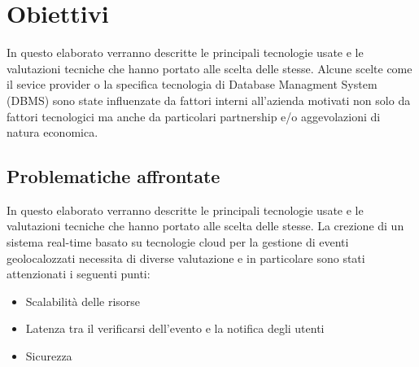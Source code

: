 \chapter{Obiettivi}
In questo elaborato verranno descritte le principali tecnologie usate e le valutazioni tecniche che hanno portato alle scelta delle stesse. Alcune scelte come il sevice provider o la specifica tecnologia di Database Managment System (DBMS) sono state influenzate da fattori interni all'azienda motivati non solo da fattori tecnologici ma anche da particolari partnership e/o aggevolazioni di natura economica.


\section{Problematiche affrontate}
In questo elaborato verranno descritte le principali tecnologie usate e le valutazioni tecniche che hanno portato alle scelta delle stesse. La crezione di un sistema real-time basato su tecnologie cloud per la gestione di eventi geolocalozzati necessita di diverse valutazione e in particolare sono stati attenzionati i seguenti punti:
\begin{itemize}
\item Scalabilità delle risorse
\item Latenza tra il verificarsi dell'evento e la notifica degli utenti
\item Sicurezza
\end{itemize}

